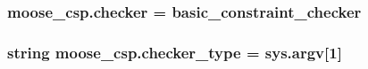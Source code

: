 \subsubsection[{checker}]{\setlength{\rightskip}{0pt plus 5cm}moose\+\_\+csp.\+checker = basic\+\_\+constraint\+\_\+checker}\label{namespacemoose__csp_ad49d86726bca570c4fe8d3ec9af9a936}
\hypertarget{namespacemoose__csp_ab1438bbdb9946523c3475eabb6c5bd64}{}
\subsubsection[{checker\+\_\+type}]{\setlength{\rightskip}{0pt plus 5cm}string moose\+\_\+csp.\+checker\+\_\+type = sys.\+argv\mbox{[}1\mbox{]}}\label{namespacemoose__csp_ab1438bbdb9946523c3475eabb6c5bd64}
